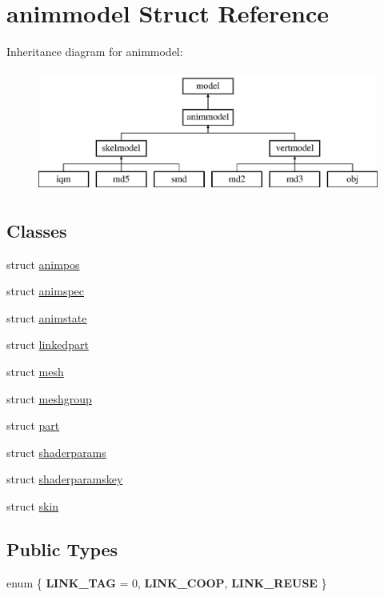 \hypertarget{structanimmodel}{}\section{animmodel Struct Reference}
\label{structanimmodel}
Inheritance diagram for animmodel\+:\begin{figure}[H]
\begin{center}
\leavevmode
\includegraphics[height=4.000000cm]{structanimmodel}
\end{center}
\end{figure}
\subsection*{Classes}
\begin{DoxyCompactItemize}
\item 
struct \hyperlink{structanimmodel_1_1animpos}{animpos}
\item 
struct \hyperlink{structanimmodel_1_1animspec}{animspec}
\item 
struct \hyperlink{structanimmodel_1_1animstate}{animstate}
\item 
struct \hyperlink{structanimmodel_1_1linkedpart}{linkedpart}
\item 
struct \hyperlink{structanimmodel_1_1mesh}{mesh}
\item 
struct \hyperlink{structanimmodel_1_1meshgroup}{meshgroup}
\item 
struct \hyperlink{structanimmodel_1_1part}{part}
\item 
struct \hyperlink{structanimmodel_1_1shaderparams}{shaderparams}
\item 
struct \hyperlink{structanimmodel_1_1shaderparamskey}{shaderparamskey}
\item 
struct \hyperlink{structanimmodel_1_1skin}{skin}
\end{DoxyCompactItemize}
\subsection*{Public Types}
\begin{DoxyCompactItemize}
\item 
\mbox{\label{structanimmodel_a3e4f076dbd12d38a1823dc852ebd4014}} 
enum \{ {\bfseries L\+I\+N\+K\+\_\+\+T\+AG} = 0, 
{\bfseries L\+I\+N\+K\+\_\+\+C\+O\+OP}, 
{\bfseries L\+I\+N\+K\+\_\+\+R\+E\+U\+SE}
 \}
\end{DoxyCompactItemize}
